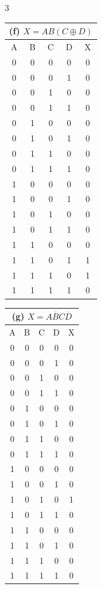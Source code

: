 \documentclass[a4paper]{article}
\begin{document}
\begin{multicols}{3}
\begin{tabular}{|c|c|c|c||c|}
\multicolumn{5}{|c|}{(f) $X = AB(C \oplus D)$} \\ \hline
A & B & C & D & X \\ \hline
0 & 0 & 0 & 0 & 0 \\ \hline
0 & 0 & 0 & 1 & 0 \\ \hline
0 & 0 & 1 & 0 & 0 \\ \hline
0 & 0 & 1 & 1 & 0 \\ \hline
0 & 1 & 0 & 0 & 0 \\ \hline
0 & 1 & 0 & 1 & 0 \\ \hline
0 & 1 & 1 & 0 & 0 \\ \hline
0 & 1 & 1 & 1 & 0 \\ \hline
1 & 0 & 0 & 0 & 0 \\ \hline
1 & 0 & 0 & 1 & 0 \\ \hline
1 & 0 & 1 & 0 & 0 \\ \hline
1 & 0 & 1 & 1 & 0 \\ \hline
1 & 1 & 0 & 0 & 0 \\ \hline
1 & 1 & 0 & 1 & 1 \\ \hline
1 & 1 & 1 & 0 & 1 \\ \hline
1 & 1 & 1 & 1 & 0 \\ \hline
\end{tabular}

\begin{tabular}{|c|c|c|c||c|}
\multicolumn{5}{|c|}{(g) $X = A\overline{B}C\overline{D}$} \\ \hline
A & B & C & D & X \\ \hline
0 & 0 & 0 & 0 & 0 \\ \hline
0 & 0 & 0 & 1 & 0 \\ \hline
0 & 0 & 1 & 0 & 0 \\ \hline
0 & 0 & 1 & 1 & 0 \\ \hline
0 & 1 & 0 & 0 & 0 \\ \hline
0 & 1 & 0 & 1 & 0 \\ \hline
0 & 1 & 1 & 0 & 0 \\ \hline
0 & 1 & 1 & 1 & 0 \\ \hline
1 & 0 & 0 & 0 & 0 \\ \hline
1 & 0 & 0 & 1 & 0 \\ \hline
1 & 0 & 1 & 0 & 1 \\ \hline
1 & 0 & 1 & 1 & 0 \\ \hline
1 & 1 & 0 & 0 & 0 \\ \hline
1 & 1 & 0 & 1 & 0 \\ \hline
1 & 1 & 1 & 0 & 0 \\ \hline
1 & 1 & 1 & 1 & 0 \\ \hline
\end{tabular}


\end{multicols}
\end{document}
